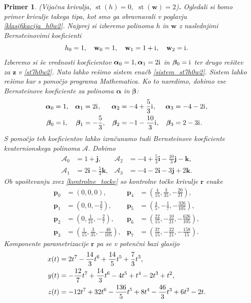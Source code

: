 \documentclass[12pt,a4paper,twoside]{article}
\newcommand{\iu}{\mathrm{i}\mkern1mu} %
\theoremstyle{definition} %
\theoremstyle{plain} %
\theoremstyle{primerstyle}
\newtheorem{primer}[definicija]{Primer}
\numberwithin{equation}{section}  %
\newcommand{\pV}{\mathbf{p}}
\newcommand{\rV}{\mathbf{r}}
\newcommand{\iV}{\mathbf{i}}
\newcommand{\jV}{\mathbf{j}}
\newcommand{\kV}{\mathbf{k}}
\newcommand{\wV}{\mathbf{w}}
\newcommand{\zV}{\mathbf{z}}
\newcommand{\AQ}{\mathcal{A}}
\newcommand{\balpha}{\boldsymbol \alpha}
\newcommand{\bbeta}{\boldsymbol \beta}
\DeclareMathOperator{\st}{st}
\begin{document}
\begin{primer}
	\label{primer_h0w2_vijacna}
	\textnormal{ }(Vijačna krivulja, $\st(h)=0,$ $\st(\wV)=2$)\textbf{.}
	Ogledali si bomo primer krivulje takega tipa, kot smo ga obravnavali v poglavju \ref{klasifikacija_h0w2}. Najprej si izberemo polinoma $h$ in $\wV$ z naslednjimi Bernsteinovimi koeficienti
	$$h_0=1,\quad\wV_0=1,\quad\wV_1=1+\iu,\quad\wV_2=\iu.$$
	Izberemo si še vrednosti koeficientov $\balpha_0=1,\balpha_1=2\iu$ in $\bbeta_0=\iu$ ter drugo rešitev za $\zV$ v \eqref{st7h0w2}. Nato lahko rešimo sistem enačb \eqref{sistem_st7h0w2}. Sistem lahko rešimo kar s pomočjo programa \emph{Mathematica}. Ko to naredimo, dobimo vse Bernsteinove koeficiente za polinoma $\balpha$ in $\bbeta$:
	\begin{align*}
		\balpha_0&=1,&\balpha_1&=2\iu,&\balpha_2&=-4+\frac{5}{3}\iu,&\balpha_3&=-4-2\iu,\\
		\bbeta_0&=\iu,&\bbeta_1&=-\frac{5}{3},&\bbeta_2&=-1-\frac{10}{3}\iu,&\bbeta_3&=2-3\iu.
	\end{align*}
	S pomočjo teh koeficientov lahko izračunamo tudi Bernsteinove koeficiente kvaternionskega polinoma $\AQ.$ Dobimo
	\begin{align*}
		\AQ_0&=1+\jV,&\AQ_2&=-4+\frac{5}{3}\iV-\frac{10}{3}\jV-\kV,\\
		\AQ_1&=2\iV-\frac{5}{3}\kV,&\AQ_3&=-4-2\iV-3\jV+2\kV.
	\end{align*}
	Ob upoštevanju zvez \eqref{kontrolne_tocke} so kontrolne točke krivulje $\rV$ enake
	\begin{align*}
		\pV_0&=(0,0,0),&\pV_4&=\left(\frac{4}{15},\frac{3}{35},-\frac{20}{21}\right)\!,\\
		\pV_1&=\left(0,0,-\frac{2}{7}\right)\!,&\pV_5&=\left(\frac{4}{5},-\frac{1}{7},-\frac{326}{105}\right)\!,\\
		\pV_2&=\left(0,\frac{1}{21},-\frac{2}{7}\right)\!,&\pV_6&=\left(\frac{22}{15},-\frac{10}{21},-\frac{626}{105}\right)\!,\\
		\pV_3&=\left(\frac{1}{15},\frac{3}{35},-\frac{46}{105}\right)\!,&\pV_7&=\left(\frac{37}{15},-\frac{22}{21},-\frac{158}{15}\right)\!.
	\end{align*}
	Komponente parametrizacije $\rV$ pa se v potenčni bazi glasijo
	\begin{align}
		x(t)&=2t^7-\frac{14}{3}t^6+\frac{14}{5}t^5+\frac{7}{3}t^3,\notag\\
		y(t)&=-\frac{12}{7}t^7+\frac{14}{3}t^6-4t^5+t^4-2t^3+t^2,\label{primer_h0w2_vijacna_krivulja}\\
		z(t)&=-12t^7+32t^6-\frac{136}{5}t^5+8t^4-\frac{46}{3}t^3+6t^2-2t.\notag

\end{align}
\end{primer}
\end{document}
